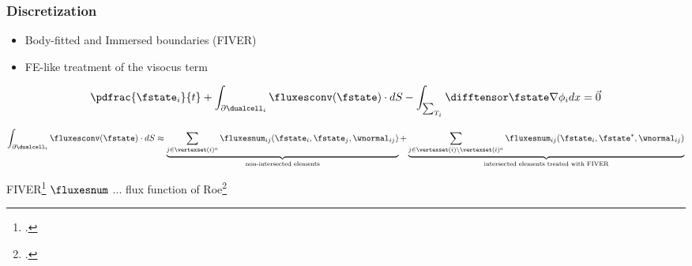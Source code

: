 
\begin{frame}
\frametitle{Discretization}
\begin{itemize}
 \item Body-fitted and Immersed boundaries (FIVER)
 \item FE-like treatment of the visocus term
\end{itemize}

\begin{align*}
\pdfrac{\fstate_i}{t} +
\int_{\partial\dualcell_i} \fluxesconv(\fstate)\cdot dS -
\int_{\sum_{T_i}} \difftensor \fstate \nabla \phi_i dx =
\vec{0}
\end{align*}


\begin{align*}
\int_{\partial\dualcell_i} \fluxesconv(\fstate)\cdot dS \approx
\underbrace{\sum_{j \in \vertexset(i)^a} \fluxesnum_{ij}(\fstate_{i},\fstate_{j},\wnormal_{ij})}_{\text{non-intersected elements}} +
\underbrace{\sum_{j \in \vertexset(i)\setminus\vertexset(i)^a} \fluxesnum_{ij}(\fstate_{i},\fstate^{*},\wnormal_{ij})}_{\text{intersected elements treated with FIVER}}
\end{align*}

FIVER\footcite{Main2014}
$\fluxesnum$ ... flux function of Roe\footcite{Roe1981}

\end{frame}






